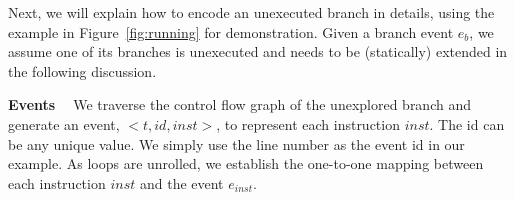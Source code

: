 Next, we will explain how to encode an unexecuted branch in details, 
using the example in Figure~\ref{fig:running} for demonstration.
Given a branch event $e_b$, we assume one of its branches is unexecuted and needs to be (statically) extended in
the following discussion.

{\bf Events \ } We traverse the control flow graph of the unexplored branch 
and generate an event,  $<t, id, inst>$, to represent 
each instruction $inst$. The id can be any unique value.
We simply use the line number as the event id in our example. As loops are
unrolled,
we establish the one-to-one mapping between each instruction $inst$ and 
the event $e_{inst}$.


